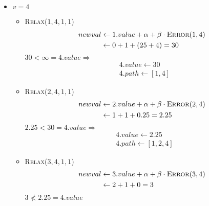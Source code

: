\documentclass[a4paper]{scrartcl}
\begin{document}
\begin{enumerate}[(a)]
\begin{itemize}
            \item $v = 4$
                \begin{itemize}
                    \item \textsc{Relax}($1, 4, 1, 1$) \\
                        \begin{equation*}
                            \begin{split}
                                newval &\gets 1.value + \alpha + \beta \cdot \textsc{Error}(1, 4) \\
                                &\gets 0 + 1 + (25 + 4) = 30
                            \end{split}
                        \end{equation*}
                        $30 < \infty = 4.value \Rightarrow$
                        \begin{align*}
                            & 4.value \gets 30 \\
                            & 4.path \gets [1, 4]
                        \end{align*}

                    \item \textsc{Relax}($2, 4, 1, 1$) \\
                        \begin{equation*}
                            \begin{split}
                                newval &\gets 2.value + \alpha + \beta \cdot \textsc{Error}(2, 4) \\
                                &\gets 1 + 1 + 0.25 = 2.25
                            \end{split}
                        \end{equation*}
                        $2.25 < 30 = 4.value \Rightarrow$
                        \begin{align*}
                            & 4.value \gets 2.25 \\
                            & 4.path \gets [1, 2, 4]
                        \end{align*}

                    \item \textsc{Relax}($3, 4, 1, 1$) \\
                        \begin{equation*}
                            \begin{split}
                                newval &\gets 3.value + \alpha + \beta \cdot \textsc{Error}(3, 4) \\
                                &\gets 2 + 1 + 0 = 3
                            \end{split}
                        \end{equation*}
                        $3 \not< 2.25 = 4.value$


\end{itemize}
\end{itemize}
\end{enumerate}
\end{document}
